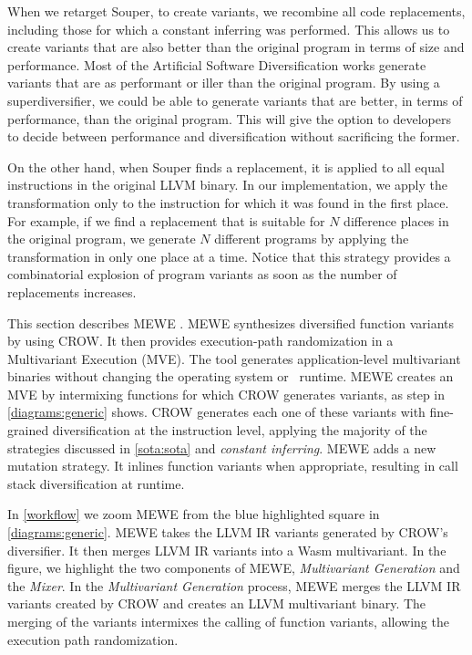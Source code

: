 When we retarget Souper, to create variants, we recombine all code replacements, including those for which a constant inferring was performed.
This allows us to create variants that are also better than the original program in terms of size and performance. Most of the Artificial Software Diversification  works generate variants that are as performant or iller than the original program. By using a superdiversifier, we could be able to generate variants that are better, in terms of performance, than the original program. This will give the option to developers to decide between performance and diversification without sacrificing the former. 

On the other hand, when Souper finds a replacement, it is applied to all equal instructions in the original LLVM binary. In our implementation, we apply the transformation only to the instruction for which it was found in the first place. For example, if we find a replacement that is suitable for $N$ difference places in the original program, we generate $N$ different programs by applying the transformation in only one place at a time. Notice that this strategy provides a combinatorial explosion of program variants as soon as the number of replacements increases.



\label{section:mewe}

\renewcommand{\tool}{MEWE\xspace}
This section describes MEWE \cite{MEWE}. 
\tool synthesizes diversified function variants by using CROW.
It then provides execution-path randomization in a Multivariant Execution (MVE).
The tool generates application-level multivariant binaries without changing the operating system or \wasm\ runtime.
MEWE creates an MVE by intermixing functions for which CROW generates variants, as step  in \autoref{diagrams:generic} shows.
CROW generates each one of these variants with fine-grained diversification at the instruction level, applying the majority of the strategies discussed in \autoref{sota:sota} and \emph{constant inferring}. \tool adds a new mutation strategy. It inlines function variants when appropriate, resulting in call stack diversification at runtime.

In \autoref{workflow} we zoom MEWE from the blue highlighted square in \autoref{diagrams:generic}. MEWE takes the LLVM IR variants generated by CROW's diversifier. It then merges LLVM IR variants into a Wasm multivariant.
In the figure, we highlight the two components of MEWE, \emph{Multivariant Generation} and the \emph{Mixer}.
In the \emph{Multivariant Generation} process, 
MEWE merges the LLVM IR variants created by CROW and creates an LLVM multivariant binary.
The merging of the variants intermixes the calling of function variants, allowing the execution path randomization.

